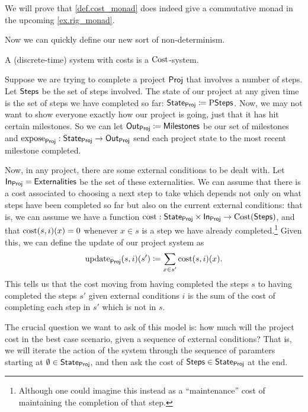 \documentclass[DynamicalBook]{subfiles}
\begin{document}
\begin{remark}
We will prove that \cref{def.cost_monad} does indeed give a commutative monad in
the upcoming \cref{ex.rig_monad}.
\end{remark}

Now we can quickly define our new sort of non-determinism.
\begin{definition}\label{def.system_with_costs}
A (discrete-time) system with costs is a $\mathrm{Cost}$-system.
\end{definition}


\begin{example}
  Suppose we are trying to complete a project $\mathsf{Proj}$ that involves a number of steps.
  Let $\mathsf{Steps}$ be the set of steps involved. The state of our project at any given
  time is the set of steps we have completed so far: $\mathsf{State}_{\mathsf{Proj}} \coloneqq
  \mathrm{P}\mathsf{Steps}$. Now, we may not want to show everyone exactly how our
  project is going, just that it has hit certain milestones. So we can let
  $\mathsf{Out}_{\mathsf{Proj}} \coloneqq \mathsf{Milestones}$ be our set of milestones and
  $\mathrm{expose}_{\mathsf{Proj}} : \mathsf{State}_{\mathsf{Proj}} \to \mathsf{Out}_{\mathsf{Proj}}$ send each project state to the
  most recent milestone completed.

  Now, in any project, there are some external conditions
  to be dealt with. Let $\mathsf{In}_{\mathsf{Proj}} = \mathsf{Externalities}$
  be the set of these externalities. We can assume that there is a cost
  associated to choosing a next step to take which depends not only on what
  steps have been completed so far but also on the current external conditions:
  that is, we can assume we have a function $\mathrm{cost} : \mathsf{State}_{\mathsf{Proj}} \times
  \mathsf{In}_{\mathsf{Proj}} \to \mathrm{Cost}(\mathsf{Steps})$, and that $\mathrm{cost}(s, i)(x) = 0$
  whenever $x \in s$ is a step we have already completed.\footnote{Although one
    could imagine this instead as a ``maintenance'' cost of maintaining the
    completion of that step.} Given this, we can define the update
  of our project system as
  \[
\mathrm{update}_{\mathsf{Proj}}(s, i)(s') \coloneqq \sum_{x \in s'} \mathrm{cost}(s,
  i)(x).
  \]
  This tells us that the cost moving from having completed the steps $s$ to
  having completed the steps $s'$ given external conditions $i$ is the sum of
  the cost of completing each step in $s'$ which is not in $s$.

  The crucial question we want to ask of this model is: how much will the
  project cost in the best case scenario, given a sequence of external
  conditions? That is, we will iterate the action of the system through the
  sequence of paramters starting at
  $\emptyset \in \mathsf{State}_{\mathsf{Proj}}$, and then ask the cost of $\mathsf{Steps} \in
  \mathsf{State}_{\mathsf{Proj}}$ at the end. 
\end{example}
\end{document}

